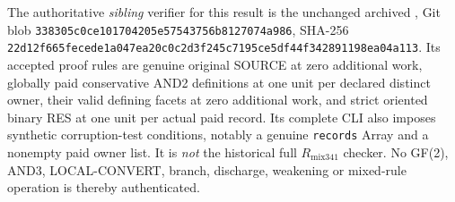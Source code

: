 \documentclass[11pt]{article}
\begin{document}
The authoritative \emph{sibling} verifier for this result is the unchanged archived
, Git blob
\texttt{338305c0ce101704205e57543756b8127074a986}, SHA-256
\texttt{22d12f665fecede1a047ea20c0c2d3f245c7195ce5df44f342891198ea04a113}.
Its accepted proof rules are genuine original SOURCE at zero additional work, globally paid conservative AND2 definitions at one unit per declared distinct owner, their valid defining facets at zero additional work, and strict oriented binary RES at one unit per actual paid record. Its complete CLI also imposes synthetic corruption-test conditions, notably a genuine \texttt{records} Array and a nonempty paid owner list. It is \emph{not} the historical full $R_{\mathrm{mix341}}$ checker. No GF(2), AND3, LOCAL-CONVERT, branch, discharge, weakening or mixed-rule operation is thereby authenticated.
\end{document}

